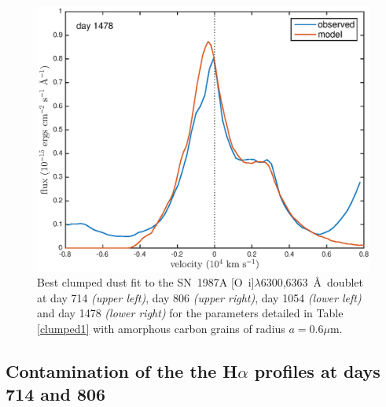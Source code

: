 \documentclass[useAMS,usenatbib,usegraphicx]{mnras}
\begin{document}
\begin{figure}
\begin{center}
\includegraphics[trim =37 10 45 15,clip=true,scale=0.41]{clump_1/best_fit/d1478OI}
\caption{Best clumped dust fit to the SN~1987A [O~{\sc i}]$\lambda$6300,6363~\AA\ doublet at day 714 \textit{(upper left)}, day 806 \textit{(upper right)}, day 1054 \textit{(lower left)} and day 1478 \textit{(lower right)} for the parameters detailed in Table \ref{clumped1} with amorphous carbon grains of radius $a=0.6 \mu$m.}
\label{OI_clump1}
\end{center}
\end{figure}


\subsection{Contamination of the the H$\alpha$ profiles at days 714 and 806}
\end{document}
